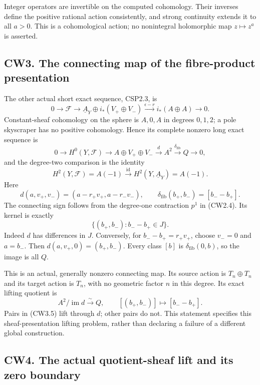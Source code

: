 Integer operators are invertible on the computed cohomology. Their
inverses define the positive rational action consistently, and strong
continuity extends it to all \(a>0\). This is a cohomological action; no
nonintegral holomorphic map \(z\mapsto z^a\) is asserted.

\subsection{CW3. The connecting map of the fibre-product
presentation}\label{cw3.-the-connecting-map-of-the-fibre-product-presentation}

The other actual short exact sequence, CSP2.3, is \[
0\to\mathscr F\to
\underline A_Y\oplus i_*(V_+\oplus V_-)
\xrightarrow{\epsilon-r}i_*(A\oplus A)\to0.
\tag{CW3.1}
\] Constant-sheaf cohomology on the sphere is \(A,0,A\) in degrees
\(0,1,2\); a pole skyscraper has no positive cohomology. Hence its
complete nonzero long exact sequence is \[
0\to H^0(Y,\mathscr F)\to A\oplus V_+\oplus V_-
\xrightarrow d A^2
\xrightarrow{\delta_{\mathrm{fib}}}Q\to0,
\tag{CW3.2}
\] and the degree-two comparison is the identity \[
H^2(Y,\mathscr F)=A(-1)\xrightarrow{\mathrm{id}}
H^2(Y,\underline A_Y)=A(-1).
\tag{CW3.3}
\] Here \[
d(a,v_+,v_-)=(a-r_+v_+,a-r_-v_-),\qquad
\delta_{\mathrm{fib}}(b_+,b_-)=[b_--b_+].
\tag{CW3.4}
\] The connecting sign follows from the degree-one contraction \(p^1\)
in (CW2.4). Its kernel is exactly \[
\{(b_+,b_-):b_--b_+\in J\}.
\tag{CW3.5}
\] Indeed \(d\) has differences in \(J\). Conversely, for
\(b_--b_+=r_+v_+\), choose \(v_-=0\) and \(a=b_-\). Then
\(d(a,v_+,0)=(b_+,b_-)\). Every class \([b]\) is
\(\delta_{\mathrm{fib}}(0,b)\), so the image is all \(Q\).

This is an actual, generally nonzero connecting map. Its source action
is \(T_n\oplus T_n\) and its target action is \(T_n\), with no geometric
factor \(n\) in this degree. Its exact lifting quotient is \[
A^2/\operatorname{im}d\xrightarrow{\sim}Q,\qquad
[(b_+,b_-)]\mapsto[b_--b_+].
\tag{CW3.6}
\] Pairs in (CW3.5) lift through \(d\); other pairs do not. This
statement specifies this sheaf-presentation lifting problem, rather than
declaring a failure of a different global construction.

\subsection{CW4. The actual quotient-sheaf lift and its zero
boundary}\label{cw4.-the-actual-quotient-sheaf-lift-and-its-zero-boundary}

